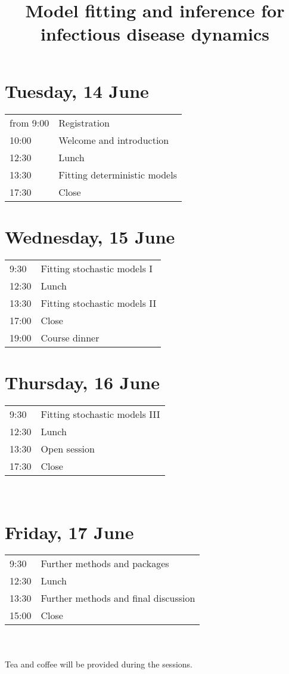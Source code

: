 \documentclass[a4paper]{article}
\title{Model fitting and inference for\\infectious disease dynamics}
\author{}
\date{}
\begin{document}
\maketitle

\section*{Tuesday, 14 June}
\label{sec:tuesday}

\begin{tabular}{R{1.5cm} l}
from 9:00 & Registration\\
10:00 & Welcome and introduction\\
12:30 & Lunch\\
13:30 & Fitting deterministic models\\
17:30 & Close\\
\end{tabular}

\section*{Wednesday, 15 June}
\label{sec:wednesday}
\begin{tabular}{R{1.5cm} l}
9:30 & Fitting stochastic models I\\
12:30 & Lunch\\
13:30 & Fitting stochastic models II\\
17:00 & Close\\
19:00 & Course dinner
\end{tabular}

\section*{Thursday, 16 June}
\label{sec:thursday}
\begin{tabular}{R{1.5cm} l}
9:30 & Fitting stochastic models III\\
12:30 & Lunch\\
13:30 & Open session\\
17:30 & Close\\
\end{tabular}\\

\section*{Friday, 17 June}
\label{sec:thursday}
\begin{tabular}{R{1.5cm} l}
9:30 & Further methods and packages\\
12:30 & Lunch\\
13:30 & Further methods and final discussion\\
15:00 & Close\\
\end{tabular}\\
\vspace{0.5cm}\\
Tea and coffee will be provided during the sessions.
\end{document}
